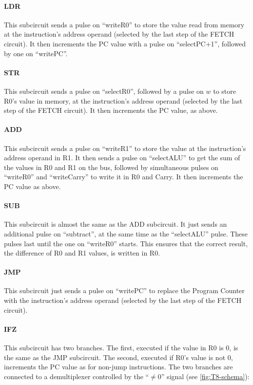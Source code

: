 \medskip \paragraph{LDR} This subcircuit sends a pulse on ``writeR0'' to store
the value read from memory at the instruction's address operand (selected by
the last step of the FETCH circuit). It then increments the PC value with a
pulse on ``selectPC+1'', followed by one on ``writePC''.

\medskip \paragraph{STR} This subcircuit sends a pulse on ``selectR0'',
followed by a pulse on $w$ to store R0's value in memory, at the instruction's
address operand (selected by the last step of the FETCH circuit). It then
increments the PC value, as above.

\medskip \paragraph{ADD} This subcircuit sends a pulse on ``writeR1'' to store
the value at the instruction's address operand in R1. It then sends a pulse on
``selectALU'' to get the sum of the values in R0 and R1 on the bus, followed by
simultaneous pulses on ``writeR0'' and ``writeCarry'' to write it in R0 and
Carry. It then increments the PC value as above.

\medskip \paragraph{SUB} This subcircuit is almost the same as the ADD
subcircuit. It just sends an additional pulse on ``subtract'', at the same time
as the ``selectALU'' pulse. These pulses last until the one on ``writeR0''
starts. This ensures that the correct result, the difference of R0 and R1
values, is written in R0.

\medskip \paragraph{JMP} This subcircuit just sends a pulse on ``writePC'' to
replace the Program Counter with the instruction's address operand (selected by
the last step of the FETCH circuit).

\medskip \paragraph{IFZ} This subcircuit has two branches. The first, executed
if the value in R0 is $0$, is the same as the JMP subcircuit. The second,
executed if R0's value is not $0$, increments the PC value as for non-jump
instructions. The two branches are connected to a demultiplexer controlled by
the ``$\ne 0$'' signal (see \cref{fig:T8-schema}):


